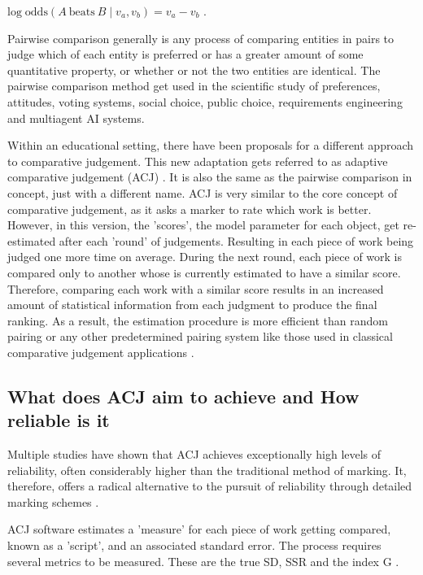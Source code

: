 		\begin{center}
			 
		$\displaystyle \mathrm {log\;odds} (A\ {\text{beats}}\ B\mid v_{a},v_{b})=v_{a}-v_{b}$ .
		
		\end{center}
	
		Pairwise comparison generally is any process of comparing entities in pairs to judge which of each entity is preferred or has a greater amount of some quantitative property, or whether or not the two entities are identical. The pairwise comparison method get used in the scientific study of preferences, attitudes, voting systems, social choice, public choice, requirements engineering and multiagent AI systems.
		
		Within an educational setting, there have been proposals for a different approach to comparative judgement.  This new adaptation gets referred to as adaptive comparative judgement (ACJ) \cite{pollitt2012method}. It is also the same as the pairwise comparison in concept, just with a different name. ACJ is very similar to the core concept of comparative judgement, as it asks a marker to rate which work is better.  However, in this version, the 'scores', the model parameter for each object, get re-estimated after each 'round' of judgements. Resulting in each piece of work being judged one more time on average. During the next round, each piece of work is compared only to another whose is currently estimated to have a similar score. Therefore, comparing each work with a similar score results in an increased amount of statistical information from each judgment to produce the final ranking. As a result, the estimation procedure is more efficient than random pairing or any other predetermined pairing system like those used in classical comparative judgement applications \cite{pollitt2012method}.
		
		\subsection{What does ACJ aim to achieve and How reliable is it}
		
		Multiple studies have shown that ACJ achieves exceptionally high levels of reliability, often considerably higher than the traditional method of marking. It, therefore, offers a radical alternative to the pursuit of reliability through detailed marking schemes \cite{pollitt2012method}. 
		
		ACJ software estimates a 'measure' for each piece of work getting compared, known as a 'script', and an associated standard error. The process requires several metrics to be measured. These are the true SD, SSR and the index G \cite{ bramley2015investigating}.
		
